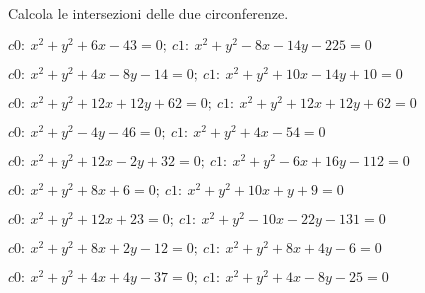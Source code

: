 \begin{esercizio}\label{ese:}
 Calcola le intersezioni delle due circonferenze.
 \begin{enumeratea}
  \item  \(c0:~x^2 + y^2 +6x -43 = 0;~c1:~x^2 + y^2 -8x -14y -225 = 0\)\\
   \makebox[\linewidth][r]
   {[\(ar:~y = - x -13;~A \punto{-9}{-4};~B \punto{-7}{-6}\)]}
  \item  \(c0:~x^2 + y^2 +4x -8y -14 = 0;~c1:~x^2 + y^2 +10x -14y +10 = 0\)\\
   \makebox[\linewidth][r]
   {[\(ar:~y = x +4;~A \punto{3}{7};~B \punto{-5}{-1}\)]}
  \item  \(c0:~x^2 + y^2 +12x +12y +62 = 0;~c1:~x^2 + y^2 +12x +12y +62=0\)\\
   \makebox[\linewidth][r]
   {[\(ar:~y = x -2;~A \punto{-7}{-9};~B \punto{-3}{-5}\)]}
  \item  \(c0:~x^2 + y^2 -4y -46 = 0;~c1:~x^2 + y^2 +4x -54 = 0\)\\
   \makebox[\linewidth][r]
   {[\(ar:~y = - x +2;~A \punto{-5}{7};~B \punto{5}{-3}\)]}
  \item  \(c0:~x^2 + y^2 +12x -2y +32 = 0;~c1:~x^2 + y^2 -6x +16y -112 = 0\)\\
   \makebox[\linewidth][r]
   {[\(ar:~y = x +8;~A \punto{-5}{3};~B \punto{-8}{0}\)]}
  \item  \(c0:~x^2 + y^2 +8x +6 = 0;~c1:~x^2 + y^2 +10x +y +9 = 0\)\\
   \makebox[\linewidth][r]
   {[\(ar:~y = -2 x -3;~A \punto{-1}{-1};~B \punto{-3}{3}\)]}
  \item  \(c0:~x^2 + y^2 +12x +23 = 0;~c1:~x^2 + y^2 -10x -22y -131 = 0\)\\
   \makebox[\linewidth][r]
   {[\(ar:~y = - x -7;~A \punto{-4}{-3};~B \punto{-9}{2}\)]}
  \item  \(c0:~x^2 + y^2 +8x +2y -12 = 0;~c1:~x^2 + y^2 +8x +4y -6 = 0\)\\
   \makebox[\linewidth][r]
   {[\(ar:~y = -3;~A \punto{1}{-3};~B \punto{-9}{-3}\)]}
  \item  \(c0:~x^2 + y^2 +4x +4y -37 = 0;~c1:~x^2 + y^2 +4x -8y -25 = 0\)\\
   \makebox[\linewidth][r]
   {[\(ar:~y = 1;~A \punto{-8}{1};~B \punto{4}{1}\)]}
 \end{enumeratea}
\end{esercizio}

